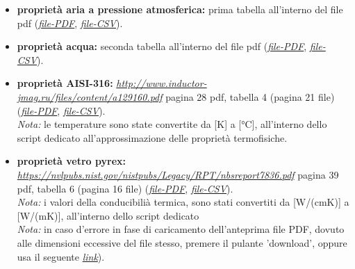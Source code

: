 \documentclass[a4paper,10pt]{article}                                                                                       %
\begin{document}
  \begin{itemize}                                                                                                           %
    \item \textbf{proprietà aria a pressione atmosferica:}
      prima tabella all'interno del file pdf
      (\textit{\href{https://github.com/CristianMerli/DataAnalysis/blob/master/lab_doc/TabelleAriaAcqua.pdf}{file-PDF}},
      \textit{\href{https://github.com/CristianMerli/DataAnalysis/blob/master/data_analysis/thermophys_vars/air_atmp_thermo_vars.csv}{file-CSV}}).
    \item \textbf{proprietà acqua:}
      seconda tabella all'interno del file pdf
      (\textit{\href{https://github.com/CristianMerli/DataAnalysis/blob/master/lab_doc/TabelleAriaAcqua.pdf}{file-PDF}},
      \textit{\href{https://github.com/CristianMerli/DataAnalysis/blob/master/data_analysis/thermophys_vars/water_thermo_vars.csv}{file-CSV}}).
    \item \textbf{proprietà AISI-316:}
      \textit{\href{http://www.inductor-jmag.ru/files/content/a129160.pdf}{http://www.inductor-jmag.ru/files/content/a129160.pdf}}
      pagina 28 pdf, tabella 4 (pagina 21 file)
      (\textit{\href{https://github.com/CristianMerli/DataAnalysis/blob/master/lab_doc/AISI316.pdf}{file-PDF}},
      \textit{\href{https://github.com/CristianMerli/DataAnalysis/blob/master/data_analysis/thermophys_vars/aisi_316_thermo_vars.csv}{file-CSV}}).
      \vspace{1.5mm}\\\textit{Nota:} le temperature sono state convertite da [K] a [°C], all'interno dello script dedicato
      all'approssimazione delle proprietà termofisiche.
    \item \textbf{proprietà vetro pyrex:}
      \textit{\href{https://nvlpubs.nist.gov/nistpubs/Legacy/RPT/nbsreport7836.pdf}{https://nvlpubs.nist.gov/nistpubs/Legacy/RPT/nbsreport7836.pdf}}
      pagina 39 pdf, tabella 6 (pagina 16 file)
      (\textit{\href{https://github.com/CristianMerli/DataAnalysis/blob/master/lab_doc/Pyrex_glass.pdf}{file-PDF}},
      \textit{\href{https://github.com/CristianMerli/DataAnalysis/blob/master/data_analysis/thermophys_vars/pyrex_glass_thermo_vars.csv}{file-CSV}}).
      \vspace{1.5mm}\\\textit{Nota:} i valori della conducibilià termica, sono stati convertiti da [W/(cm\*K)] a [W/(m\*K)],
      all'interno dello script dedicato
      \vspace{1.5mm}\\\textit{Nota:} in caso d'errore in fase di caricamento dell'anteprima file PDF, dovuto alle
      dimensioni eccessive del file stesso, premere il pulante 'download', oppure usa il seguente
      \textit{\href{https://github.com/CristianMerli/DataAnalysis/raw/master/lab_doc/Pyrex_glass.pdf}{link}}).
  \end{itemize}                                                                                                             %
\end{document}

